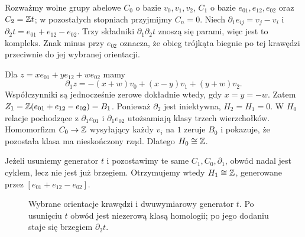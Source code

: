 \begin{przyklad}
\label{prz:homologia-alg-trojkat}
Rozważmy wolne grupy abelowe $C_0$ o bazie
$v_0,v_1,v_2$, $C_1$ o bazie $e_{01},e_{12},e_{02}$
oraz $C_2=\mathbb{Z} t$; w pozostałych stopniach
przyjmijmy $C_n=0$. Niech
$\partial_1e_{ij}=v_j-v_i$ i
$\partial_2t=e_{01}+e_{12}-e_{02}$.
Trzy składniki $\partial_1\partial_2t$
znoszą się parami, więc jest to kompleks.
Znak minus przy $e_{02}$ oznacza, że obieg
trójkąta biegnie po tej krawędzi przeciwnie
do jej wybranej orientacji.

Dla $z=x e_{01}+y e_{12}+w e_{02}$ mamy
\[
 \partial_1 z=-(x+w)v_0+(x-y)v_1+(y+w)v_2.
\]
Współczynniki są jednocześnie zerowe dokładnie
wtedy, gdy $x=y=-w$. Zatem
$Z_1=\mathbb{Z}(e_{01}+e_{12}-e_{02})=B_1$.
Ponieważ $\partial_2$ jest iniektywna,
$H_2=H_1=0$. W $H_0$ relacje pochodzące
z $\partial_1 e_{01}$ i $\partial_1 e_{02}$
utożsamiają klasy trzech wierzchołków.
Homomorfizm $C_0\to\mathbb{Z}$ wysyłający każdy
$v_i$ na $1$ zeruje $B_0$ i pokazuje, że
pozostała klasa ma nieskończony rząd.
Dlatego $H_0\cong\mathbb{Z}$.

Jeżeli usuniemy generator $t$ i pozostawimy
te same $C_1,C_0,\partial_1$, obwód nadal
jest cyklem, lecz nie jest już brzegiem.
Otrzymujemy wtedy $H_1\cong\mathbb{Z}$, generowane
przez $[e_{01}+e_{12}-e_{02}]$.
\end{przyklad}

\begin{figure}[!htbp]
\centering
{}
\caption{Wybrane orientacje krawędzi i dwuwymiarowy generator $t$.
Po usunięciu $t$ obwód jest niezerową klasą homologii;
po jego dodaniu staje się brzegiem $\partial_2t$.}
\label{fig:homologia-alg-trojkat}
\end{figure}


